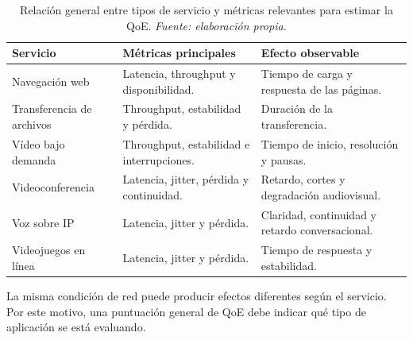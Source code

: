 \begin{table}[H]
    \centering
    \small
    \renewcommand{\arraystretch}{1.35}

    \caption[Relación entre servicios y métricas de QoE.]
    {Relación general entre tipos de servicio y métricas relevantes para
    estimar la QoE. \textit{Fuente: elaboración propia.}}

    \label{tab:qoe-tipo-servicio}

    \begin{tabular}{
        p{}
        p{}
        p{}
    }
        \hline

        \textbf{Servicio}
        &
        \textbf{Métricas principales}
        &
        \textbf{Efecto observable}
        \\

        \hline

        Navegación web
        &
        Latencia, throughput y disponibilidad.
        &
        Tiempo de carga y respuesta de las páginas.
        \\

        Transferencia de archivos
        &
        Throughput, estabilidad y pérdida.
        &
        Duración de la transferencia.
        \\

        Vídeo bajo demanda
        &
        Throughput, estabilidad e interrupciones.
        &
        Tiempo de inicio, resolución y pausas.
        \\

        Videoconferencia
        &
        Latencia, jitter, pérdida y continuidad.
        &
        Retardo, cortes y degradación audiovisual.
        \\

        Voz sobre IP
        &
        Latencia, jitter y pérdida.
        &
        Claridad, continuidad y retardo conversacional.
        \\

        Videojuegos en línea
        &
        Latencia, jitter y pérdida.
        &
        Tiempo de respuesta y estabilidad.
        \\

        \hline
    \end{tabular}
\end{table}

La misma condición de red puede producir efectos diferentes según el
servicio. Por este motivo, una puntuación general de QoE debe indicar qué
tipo de aplicación se está evaluando.


